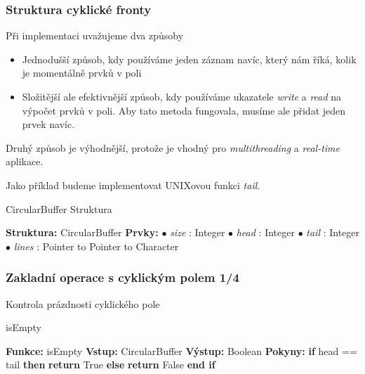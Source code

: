 \documentclass[]{fitthesispresn}
\begin{document}
    \begin{frame}
        \frametitle{Struktura cyklické fronty}
        Při implementaci uvažujeme dva způsoby
        \begin{itemize}
            \item Jednodušší způsob, kdy používáme jeden záznam navíc, který nám říká, kolik je momentálně prvků v poli
            \item Složitější ale efektivnější způsob, kdy používáme ukazatele \emph{write} a \emph{read} na výpočet prvků v poli. Aby tato metoda fungovala, musíme ale přidat jeden prvek navíc.
        \end{itemize}
        Druhý způsob je výhodnější, protože je vhodný pro \emph{multithreading} a \emph{real-time} aplikace.
        
        Jako příklad budeme implementovat UNIXovou funkci \emph{tail}.
        \begin{algorithm}[H]
        \caption{CircularBuffer Struktura}
        \label{alg:circularbuffer}
        \begin{algorithmic}[1]
            \State \textbf{Struktura:} CircularBuffer
            \State \textbf{Prvky:}
            \State \hspace{\algorithmicindent} $\bullet$ \textit{size} : Integer
            \State \hspace{\algorithmicindent} $\bullet$ \textit{head} : Integer
            \State \hspace{\algorithmicindent} $\bullet$ \textit{tail} : Integer
            \State \hspace{\algorithmicindent} $\bullet$ \textit{lines} : Pointer to Pointer to Character
        \end{algorithmic}
        \end{algorithm}
    \end{frame}

    \begin{frame}
        \frametitle{Zakladní operace s cyklickým polem 1/4}
        Kontrola prázdnosti cyklického pole
        \begin{algorithm}[H]
        \caption{isEmpty}
        \label{alg:isempty}
        \begin{algorithmic}[1]
            \State \textbf{Funkce:} isEmpty
            \State \textbf{Vstup:} CircularBuffer
            \State \textbf{Výstup:} Boolean
            \State \textbf{Pokyny:}
            \State \hspace{\algorithmicindent} \textbf{if} head == tail \textbf{then}
            \State \hspace{\algorithmicindent} \hspace{\algorithmicindent} \textbf{return} True
            \State \hspace{\algorithmicindent} \textbf{else}
            \State \hspace{\algorithmicindent} \hspace{\algorithmicindent} \textbf{return} False
            \State \hspace{\algorithmicindent} \textbf{end if}
        \end{algorithmic}
        \end{algorithm}
    \end{frame}
\end{document}
